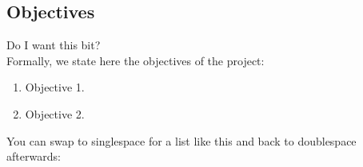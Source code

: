 \documentclass[12pt,a4paper]{article}
\begin{document}
\subsection{Objectives}
\label{sec:objectives}
Do I want this bit?\\
Formally, we state here the objectives of the project:
\begin{enumerate}
\item Objective 1.
\item Objective 2.
\end{enumerate}

You can swap to singlespace for a list like this and back to doublespace afterwards:



\end{document}
